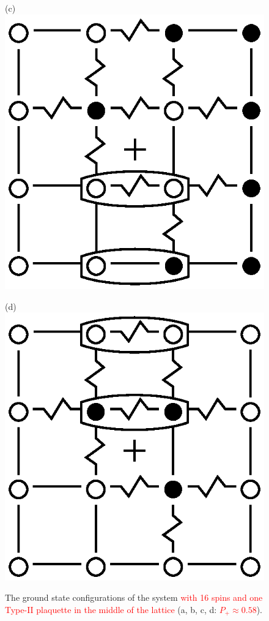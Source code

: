 \documentclass[preprint,12pt]{elsarticle}
\begin{document}
\begin{figure}[H]
\begin{minipage}[h]{0.2\linewidth}
		\end{minipage}
		\hfill
		\begin{minipage}[h]{0.2\linewidth}
			\centering(c)
			\includegraphics[width=1\linewidth]{pictures/Cl1_Type2_gs3.eps}
		\end{minipage}
		\hfill
		\begin{minipage}[h]{0.2\linewidth}
			\centering(d)
			\includegraphics[width=1\linewidth]{pictures/Cl1_Type2_gs4.eps}
		\end{minipage}
		\caption{The ground state configurations of the system \textcolor{red}{with 16 spins and one Type-II plaquette in the middle of the lattice} (a, b, c, d: \textcolor{red}{  $P_+\approx0.58$}).}
		\label{fig:4x4.1}
		

\end{figure}
\end{document}
